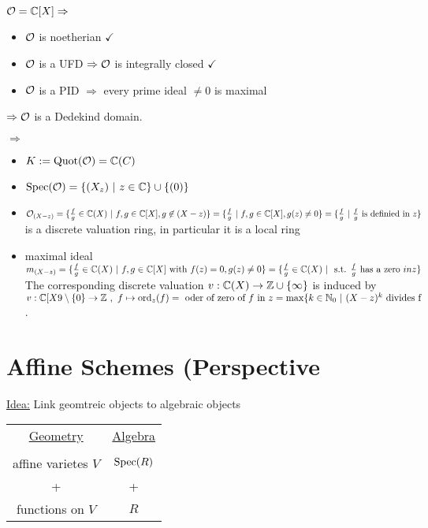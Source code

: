 \begin{Bsp}
$\mathcal{O}=\mathbb{C}[X] \Rightarrow$
\begin{itemize}
\item $\mathcal{O}$ is noetherian $\checkmark$ 
\item $\mathcal{O}$ is a UFD $\Rightarrow \mathcal{O}$ is integrally closed $\checkmark$
\item $\mathcal{O}$ is a PID $\Rightarrow$ every prime ideal $\neq 0$ is maximal
\end{itemize}
$\Rightarrow \mathcal{O}$ is a Dedekind domain.

$\Rightarrow$
\begin{itemize}
\item $K := \operatorname{Quot}(\mathcal{O})=\mathbb{C}(C)$
\item $\operatorname{Spec}(\mathcal{O})=\{(X_z) \ | \ z \in \mathbb{C}\} \cup \{(0)\}$
\item $\O_{(X-z)} = \{\frac{f}{g} \in \C(X) \ | \ f,g \in \C[X], g \not \in (X-z)\}\\
\vphantom{\O_{(X-z)}} = \{\frac{f}{g} \ | \ f,g \in \C[X] , g(z) \neq 0 \}\\
\vphantom{\O_{(X-z)}} = \{\frac{f}{g} \ | \ \frac{f}{g} \text{ is definied in } z\}$\\
is a discrete valuation ring, in particular it is a local ring
\item maximal ideal $m_{(X-z)} = \{\frac{f}{g} \in \mathbb{C}(X) \ | \ f,g \in \mathbb{C}[X] \text{ with } f(z)=0, g(z) \neq 0 \} = \{\frac{f}{g} \in \mathbb{C}(X) \ | \ \text{ s.t. } \frac{f}{g} \text{ has a zero } in z\}$
The corresponding discrete valuation $v: \mathbb{C}(X) \to \mathbb{Z} \cup \{\infty\}$ is induced by $v: \C[X9 \setminus \{0\} \to \Z \ , \ f \mapsto \ord_z(f)= \text{ oder of zero of } f \text{ in } z = \max\{k \in \N_0 \ | \ (X-z)^k \text{ divides f}$.
\end{itemize}
\end{Bsp}

\section{Affine Schemes (Perspective}
\underline{Idea:} Link geomtreic objects to algebraic objects\\
\begin{tabular}{c c}
\underline{Geometry} & \underline{Algebra}\\
&\\
affine varietes $V$ & $\operatorname{Spec}(R)$\\
+&+\\
functions on $V$ & $R$
\end{tabular}

